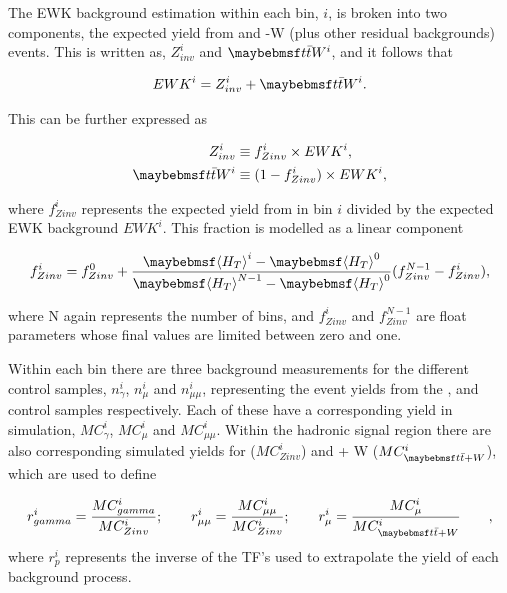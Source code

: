 The \ac{EWK} background estimation within each bin, $i$, is broken into two components, the expected yield from \zinv and \ttbar-W (plus other residual backgrounds) events. This is written as, $Z^{i}_{inv}$ and $\ttbar W^{i}$, and it follows that 

\begin{equation}
EWK^{i} = Z^{i}_{inv} + \ttbar W^{i}.
\end{equation}

This can be further expressed as

\begin{align}
\label{eq:zinvcontribution}
Z^{i}_{inv} &\equiv f^{i}_{Zinv} \times EWK^{i}, \\
\label{eq:ttwcontribution}
\ttbar W^{i} &\equiv (1 - f^{i}_{Zinv}) \times EWK^{i},
\end{align}

where $f^{i}_{Zinv}$ represents the expected yield from \zinv in bin $i$ divided by the expected \ac{EWK} background $EWK^{i}$. This fraction is modelled as a linear component

\begin{equation}
f^{i}_{Zinv} = f^{0}_{Zinv} + \frac{\meanht^{i}-\meanht^{0}}{\meanht^{N-1}-\meanht^{0}}(f^{N-1}_{Zinv} - f^{i}_{Zinv}),
\end{equation}

where N again represents the number of \theht bins, and $f^{i}_{Zinv}$ and $f^{N-1}_{Zinv}$ are float parameters whose final values are limited between zero and one. 

Within each \theht bin there are three background measurements for the different control samples, $n^{i}_{\gamma}$, $n^{i}_{\mu}$ and $n^{i}_{\mu\mu}$, representing the event yields from the \gpjets, \mupjets and \dimupjets control samples respectively. Each of these have a corresponding yield in simulation, $MC^{i}_{\gamma}$, $MC^{i}_{\mu}$ and $MC^{i}_{\mu\mu}$.  Within the hadronic signal region there are also corresponding simulated yields for \zinv ($MC^{i}_{Zinv}$) and \ttbar + W ($MC^{i}_{\ttbar+W}$), which are used to define

\begin{equation}
r^{i}_{\gamma} = \frac{MC^{i}_{\gamma}}{MC^{i}_{Zinv}}; \qquad r^{i}_{\mu\mu} = \frac{MC^{i}_{\mu\mu}}{MC^{i}_{Zinv}}; \qquad r^{i}_{\mu} = \frac{MC^{i}_{\mu}}{MC^{i}_{\ttbar + W}} \qquad,
\end{equation}
where $r^{i}_{p}$ represents the inverse of the \ac{TF}'s used to extrapolate the yield of each background process.

